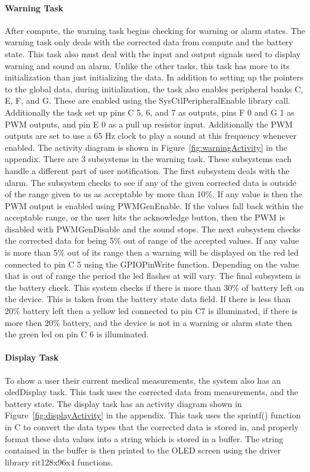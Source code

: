 \documentclass[12pt]{article} %
\begin{document}
\paragraph{Warning Task}
After compute, the warning task begins checking for warning or alarm states. The
warning task only deals with the corrected data from compute and the battery
state. This task also must deal with the input and output signals used to
display warning and sound an alarm. Unlike the other tasks, this task has more
to its initialization than just initializing the data. In addition to setting
up the pointers to the global data, during initialization, the task also
enables peripheral banks C, E, F, and G. These are enabled using the
SysCtlPeripheralEnable library call. Additionally the task set up pins C 5, 6,
and 7 as outputs, pins F 0 and G 1 as PWM outputs, and pin E 0 as a pull up
resistor input. Additionally the PWM outputs are set to use a 65 Hz clock to play
a sound at this frequency whenever enabled. The activity diagram is shown in
Figure~\ref{fig:warningActivity} in the appendix. There are 3 subsystems in the
warning task. These subsystems each handle a different part of user
notification. The first subsystem deals with the alarm. The subsystem checks to
see if any of the given corrected data is outside of the range given to us as
acceptable by more than 10\%. If any value is then the PWM output is enabled
using PWMGenEnable. If the values fall back within the acceptable range, or the
user hits the acknowledge button, then the PWM is disabled with PWMGenDisable
and the sound stops. The next subsystem checks the corrected data for being 5\%
out of range of the accepted values. If any value is more than 5\% out of its
range then a warning will be displayed on the red led connected to pin C 5
using the GPIOPinWrite function. Depending on the value that is out of range
the period the led flashes at will vary. The final subsystem is the battery
check. This system checks if there is more than 30\% of battery left on the
device. This is taken from the battery state data field. If there is less than
20\% battery left then a yellow led connected to pin C7 is illuminated, if
there is more then 20\% battery, and the device is not in a warning or alarm
state then the green led on pin C 6 is illuminated. 

\paragraph{Display Task}
To show a user their current medical measurements, the system also has an
oledDisplay task. This task uses the corrected data from measurements, and the
battery state. The display task has an activity diagram shown in
Figure~\ref{fig:displayActivity} in the appendix. This task uses the sprintf()
function in C to convert the data types that the corrected data is stored in,
and properly format these data values into a string which is stored in a
buffer. The string contained in the buffer is then printed to the OLED screen
using the driver library rit128x96x4 functions.
\end{document}
